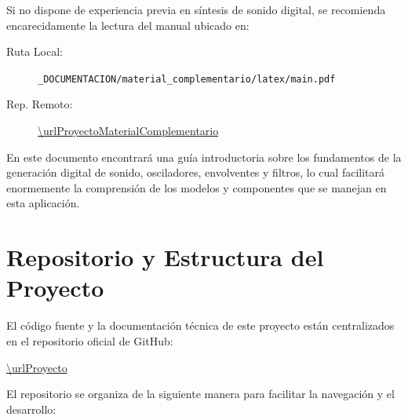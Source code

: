 \begin{tcolorbox}[colback=orange!5,colframe=orange!75!black,title=Recomendación: Conceptos de Síntesis de Sonido]
Si no dispone de experiencia previa en síntesis de sonido digital, se recomienda encarecidamente la lectura del manual ubicado en:
\begin{description}
    \item[Ruta Local:] \texttt{\_DOCUMENTACION/material\_complementario/latex/main.pdf}
    \item[Rep. Remoto:] \footnotesize{\url{\urlProyectoMaterialComplementario}}
\end{description}
En este documento encontrará una guía introductoria sobre los fundamentos de la generación digital de sonido, osciladores, envolventes y filtros, lo cual facilitará enormemente la comprensión de los modelos y componentes que se manejan en esta aplicación.
\end{tcolorbox}



\section{Repositorio y Estructura del Proyecto}

El código fuente y la documentación técnica de este proyecto están centralizados en el repositorio oficial de GitHub:

\begin{center}
    \url{\urlProyecto}
\end{center}

El repositorio se organiza de la siguiente manera para facilitar la navegación y el desarrollo:

